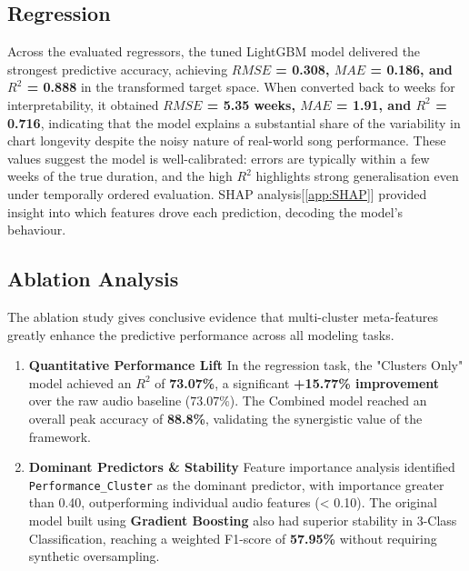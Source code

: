 \documentclass{article}
\begin{document}
\subsection{Regression}
Across the evaluated regressors, the tuned LightGBM model delivered the strongest predictive accuracy, achieving \textbf{$RMSE$ = 0.308, $MAE$ = 0.186, and $R^2$ = 0.888} in the transformed target space. When converted back to weeks for interpretability, it obtained \textbf{$RMSE$ = 5.35 weeks, $MAE$ = 1.91, and $R^2$ = 0.716}, indicating that the model explains a substantial share of the variability in chart longevity despite the noisy nature of real-world song performance. These values suggest the model is well-calibrated: errors are typically within a few weeks of the true duration, and the high $R^2$ highlights strong generalisation even under temporally ordered evaluation. SHAP analysis[\ref{app:SHAP}] provided insight into which features drove each prediction, decoding the model's behaviour.

\subsection{Ablation Analysis}
The ablation study gives conclusive evidence that multi-cluster meta-features greatly enhance the predictive performance across all modeling tasks.
\vspace{-0.5em}
\begin{enumerate}[itemsep=0.5ex, topsep=0pt, parsep=0pt, partopsep=0pt, leftmargin=*]
    \item \textbf{Quantitative Performance Lift} 
    In the regression task, the "Clusters Only" model achieved an $R^2$ of \textbf{73.07\%}, a significant \textbf{+15.77\% improvement} over the raw audio baseline ($73.07\%$). The Combined model reached an overall peak accuracy of \textbf{88.8\%}, validating the synergistic value of the framework.
    \item \textbf{Dominant Predictors \& Stability} 
    Feature importance analysis identified \texttt{Performance\_Cluster} as the dominant predictor, with importance greater than 0.40, outperforming individual audio features (< 0.10). The original model built using {\textbf{Gradient Boosting}} also had superior stability in 3-Class Classification, reaching a weighted F1-score of \textbf{57.95\%} without requiring synthetic oversampling.
\end{enumerate}
\vspace{-0.6em}
\end{document}
